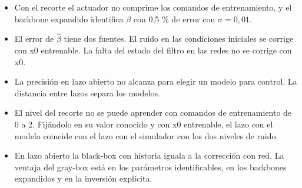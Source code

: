 \documentclass[10pt,a4paper]{article}
\newcommand{\bh}{\hat\beta}
\begin{document}
\begin{itemize}[leftmargin=*,itemsep=0.4em]
\item Con el recorte el actuador no comprime los comandos de entrenamiento, y el backbone expandido identifica $\beta$ con 0,5 \% de error con $\sigma = 0{,}01$.
\item El error de $\bh$ tiene dos fuentes. El ruido en las condiciones iniciales se corrige con x0 entrenable. La falta del estado del filtro en las redes no se corrige con x0.
\item La precisión en lazo abierto no alcanza para elegir un modelo para control. La distancia entre lazos separa los modelos.
\item El nivel del recorte no se puede aprender con comandos de entrenamiento de 0 a 2. Fijándolo en su valor conocido y con x0 entrenable, el lazo con el modelo coincide con el lazo con el simulador con los dos niveles de ruido.
\item En lazo abierto la black-box con historia iguala a la corrección con red. La ventaja del gray-box está en los parámetros identificables, en los backbones expandidos y en la inversión explícita.
\end{itemize}
\end{document}

